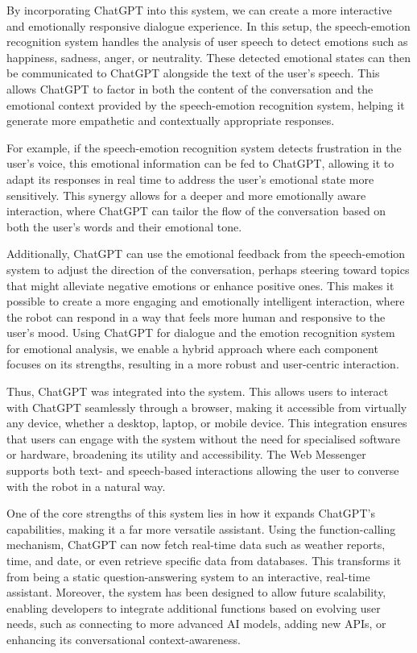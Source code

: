 By incorporating ChatGPT into this system, we can create a more interactive and emotionally responsive dialogue experience. In this setup, the speech-emotion recognition system handles the analysis of user speech to detect emotions such as happiness, sadness, anger, or neutrality. These detected emotional states can then be communicated to ChatGPT alongside the text of the user's speech. This allows ChatGPT to factor in both the content of the conversation and the emotional context provided by the speech-emotion recognition system, helping it generate more empathetic and contextually appropriate responses.

For example, if the speech-emotion recognition system detects frustration in the user's voice, this emotional information can be fed to ChatGPT, allowing it to adapt its responses in real time to address the user’s emotional state more sensitively. This synergy allows for a deeper and more emotionally aware interaction, where ChatGPT can tailor the flow of the conversation based on both the user’s words and their emotional tone.

Additionally, ChatGPT can use the emotional feedback from the speech-emotion system to adjust the direction of the conversation, perhaps steering toward topics that might alleviate negative emotions or enhance positive ones. This makes it possible to create a more engaging and emotionally intelligent interaction, where the robot can respond in a way that feels more human and responsive to the user's mood. Using ChatGPT for dialogue and the emotion recognition system for emotional analysis, we enable a hybrid approach where each component focuses on its strengths, resulting in a more robust and user-centric interaction.

Thus, ChatGPT was integrated into the system. This allows users to interact with ChatGPT seamlessly through a browser, making it accessible from virtually any device, whether a desktop, laptop, or mobile device. This integration ensures that users can engage with the system without the need for specialised software or hardware, broadening its utility and accessibility. The Web Messenger supports both text- and speech-based interactions allowing the user to converse with the robot in a natural way.

One of the core strengths of this system lies in how it expands ChatGPT's capabilities, making it a far more versatile assistant. Using the function-calling mechanism, ChatGPT can now fetch real-time data such as weather reports, time, and date, or even retrieve specific data from databases. This transforms it from being a static question-answering system to an interactive, real-time assistant. Moreover, the system has been designed to allow future scalability, enabling developers to integrate additional functions based on evolving user needs, such as connecting to more advanced AI models, adding new APIs, or enhancing its conversational context-awareness.

